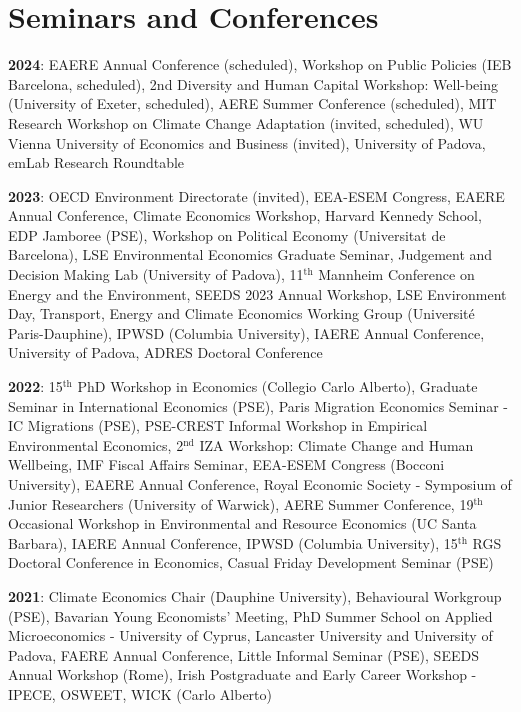 \documentclass[letterpaper,11pt]{article}
\newcommand{\resumeSubHeadingListStart}{\begin{itemize}[leftmargin=0.15in, label={}]}
\newcommand{\resumeSubHeadingListEnd}{\end{itemize}}
\begin{document}
{\section{Seminars and Conferences}
   \resumeSubHeadingListStart
   \textbf{2024}:  EAERE Annual Conference (scheduled), Workshop on Public Policies (IEB Barcelona, scheduled),  2nd Diversity and Human Capital Workshop: Well-being (University of Exeter,  scheduled),  AERE Summer Conference (scheduled), MIT Research Workshop on Climate Change Adaptation (invited, scheduled),  WU Vienna University of Economics and Business (invited), University of Padova, emLab Research Roundtable
    \resumeSubHeadingListEnd
       \resumeSubHeadingListStart
   \textbf{2023}:  OECD Environment Directorate (invited), EEA-ESEM Congress, EAERE Annual Conference, Climate Economics Workshop, Harvard Kennedy School, EDP Jamboree (PSE), Workshop on Political Economy (Universitat de Barcelona), LSE Environmental Economics Graduate Seminar, Judgement and Decision Making Lab (University of Padova), 11$^\text{th}$ Mannheim Conference on Energy and the Environment, SEEDS 2023 Annual Workshop, LSE Environment Day, Transport, Energy and Climate Economics Working Group (Université Paris-Dauphine), IPWSD (Columbia University), IAERE Annual Conference, University of Padova, ADRES Doctoral Conference
    \resumeSubHeadingListEnd
   \resumeSubHeadingListStart   
    \textbf{2022}: 15$^{\text{th}}$ PhD Workshop in Economics (Collegio Carlo Alberto), Graduate Seminar in International Economics (PSE), Paris Migration Economics Seminar - IC Migrations (PSE), PSE-CREST Informal Workshop in Empirical Environmental Economics, 2$^\text{nd}$ IZA Workshop: Climate Change and Human Wellbeing, IMF Fiscal Affairs Seminar, EEA-ESEM Congress (Bocconi University), EAERE Annual Conference, Royal Economic Society - Symposium of Junior Researchers (University of Warwick), AERE Summer Conference, 19$^\text{th}$ Occasional Workshop in Environmental and Resource Economics (UC Santa Barbara), IAERE Annual Conference, IPWSD (Columbia University), 15$^\text{th}$ RGS Doctoral Conference in Economics, Casual Friday Development Seminar (PSE)
    \resumeSubHeadingListEnd
   \resumeSubHeadingListStart
   \textbf{2021}: Climate Economics Chair (Dauphine University), Behavioural Workgroup (PSE), Bavarian Young Economists’ Meeting, PhD Summer School on Applied Microeconomics - University of Cyprus, Lancaster University and University of Padova,  FAERE Annual Conference, Little Informal Seminar (PSE), SEEDS Annual Workshop (Rome), Irish Postgraduate and Early Career Workshop - IPECE, OSWEET, WICK (Carlo Alberto)
    \resumeSubHeadingListEnd
 
}
\end{document}
